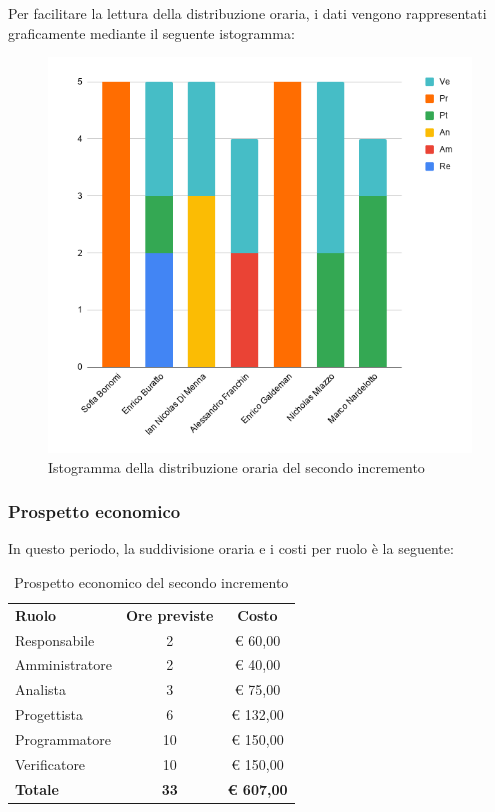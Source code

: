 \documentclass[../piano-di-progetto.tex]{subfiles}
\begin{document}
  Per facilitare la lettura della distribuzione oraria, i dati vengono rappresentati graficamente mediante il seguente istogramma:
  \begin{figure}[H]
    \centering
    \includegraphics[width=12cm]{img/ore-2-incr.png}
    \caption{Istogramma della distribuzione oraria del secondo incremento}
    \label{fig:ore-componente-progettazione}
  \end{figure}

  \subsubsection{Prospetto economico}
  In questo periodo, la suddivisione oraria e i costi per ruolo è la seguente:

  \begin{table}[H]
    \centering
    \begin{tabular}{lcc}
      \rowcolor{lightgray}
      \textbf{Ruolo}  & \textbf{Ore previste} & \textbf{Costo}    \\
Responsabile    & 2                     & € 60,00           \\
Amministratore  & 2                     & € 40,00           \\
Analista        & 3                     & € 75,00           \\
Progettista     & 6                     & € 132,00          \\
Programmatore   & 10                    & € 150,00          \\
Verificatore    & 10                    & € 150,00          \\
\textbf{Totale} & \textbf{33}           & \textbf{€ 607,00}
    \end{tabular}
    \caption{Prospetto economico del secondo incremento}
  \end{table}
\end{document}
